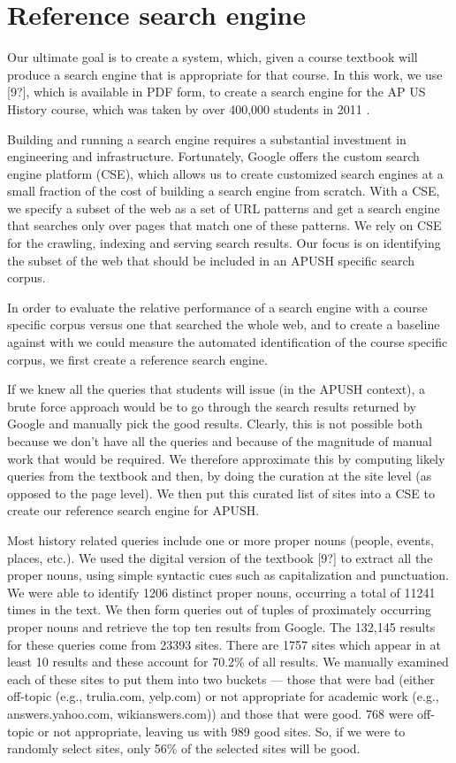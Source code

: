 \documentclass{acm_proc_article-sp}
\begin{document}
\section{Reference search engine}

Our ultimate goal is to create a system, which, given a course textbook will
produce a search engine that is appropriate for that course. In this work, we
use [9?], which is available in PDF form, to create a search engine for the AP US
History course, which was taken by over 400,000 students in 2011 \cite{wikipedia}. 

Building and running a search engine requires a substantial investment in
engineering and infrastructure. Fortunately, Google offers the custom search
engine platform (CSE), which allows us to create customized search engines at a
small fraction of the cost of building a search engine from scratch. With a CSE,
we specify a subset of the web as a set of URL patterns and get a search engine
that searches only over pages that match one of these patterns. We rely on CSE
for the crawling, indexing and serving search results. Our focus is on
identifying the subset of the web that should be included in an APUSH specific
search corpus. 

In order to evaluate the relative performance of a search engine with a course
specific corpus versus one that searched the whole web, and to create a baseline
against with we could measure the automated identification of the course
specific corpus, we first create a reference search engine. 

If we knew all the queries that students will issue (in the APUSH context), a
brute force approach would be to go through the search results returned by
Google and manually pick the good results. Clearly, this is not possible both
because we don't have all the queries and because of the magnitude of manual
work that would be required. We therefore approximate this by computing likely
queries from the textbook and then, by doing the curation at the site level (as
opposed to the page level). We then put this curated list of sites into a CSE to
create our reference search engine for APUSH. 

Most history related queries include one or more proper nouns (people, events,
places, etc.). We used the digital version of the textbook [9?] to extract all
the proper nouns, using simple syntactic cues such as capitalization and
punctuation. We were able to identify 1206 distinct proper nouns, occurring a
total of 11241 times in the text. We then form queries out of tuples of
proximately occurring proper nouns and retrieve the top ten results from
Google. The 132,145 results for these queries come from 23393 sites. There are
1757 sites which appear in at least 10 results and these account for 70.2\% of
all results. We manually examined each of these sites to put them into two
buckets --- those that were bad (either off-topic (e.g., trulia.com, yelp.com)
or not appropriate for academic work (e.g., answers.yahoo.com, wikianswers.com))
and those that were good. 768 were off-topic or not appropriate, leaving us with
989 good sites. So, if we were to randomly select sites, only 56\% of the
selected sites will be good. 
\end{document}
